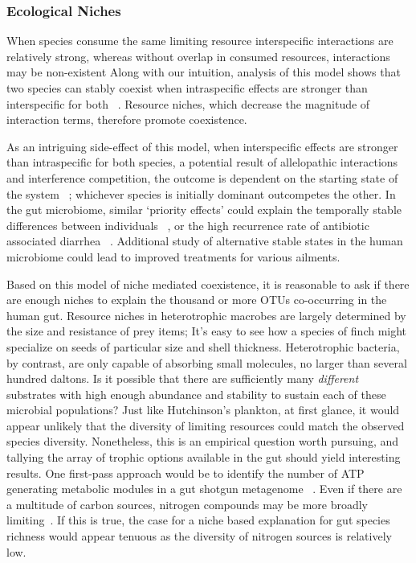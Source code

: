 \documentclass[12pt]{article}
\begin{document}
\subsubsection{Ecological Niches}
When species consume the same limiting resource
interspecific interactions are relatively strong,
whereas without overlap in consumed resources,
interactions may be non-existent
Along with our intuition, analysis of this model shows that
two species can stably coexist when
intraspecific effects are stronger than interspecific for both%
~\citep{Chesson2000a}.
Resource niches,
which decrease the magnitude of interaction terms,
therefore promote coexistence.

As an intriguing side-effect of this model,
when interspecific effects are stronger than intraspecific for both
species,
a potential result of allelopathic interactions and
interference competition,
the outcome is dependent on the starting state of the system%
~\citep{Amarasekare2002};
whichever species is initially dominant outcompetes the other.
In the gut microbiome, similar `priority effects' could explain the
temporally stable differences between individuals%
~\citep{Dethlefsen2006,Lahti2014},
or the high recurrence rate of antibiotic associated diarrhea%
~\citep{Lemon2012}.
Additional study of alternative stable states in the human
microbiome could lead to improved treatments for various ailments.

Based on this model of niche mediated coexistence,
it is reasonable to ask if there are enough niches
to explain the thousand or more OTUs co-occurring in the human gut.
Resource niches in heterotrophic macrobes are largely
determined by the size and resistance of prey items;
It's easy to see how a species of finch might specialize on
seeds of particular size and shell thickness.
Heterotrophic bacteria, by contrast, are only capable of
absorbing small molecules,
no larger than several hundred daltons.
Is it possible that there are sufficiently many \emph{different}
substrates with high enough abundance and stability
to sustain each of these microbial populations?
Just like Hutchinson's plankton,
at first glance, it would appear unlikely that the diversity
of limiting resources could match the observed species
diversity.
Nonetheless, this is an empirical question worth pursuing,
and tallying the array of trophic options available in the gut
should yield interesting results.
One first-pass approach would be to identify the number of
ATP generating metabolic modules in a gut shotgun metagenome%
~\citep{Lemon2012}.
Even if there are a multitude of carbon sources,
nitrogen compounds may be more broadly limiting~\citep{Faith2011}.
If this is true, the case for a niche based explanation for
gut species richness would appear tenuous
as the diversity of nitrogen sources is relatively low.
\end{document}

